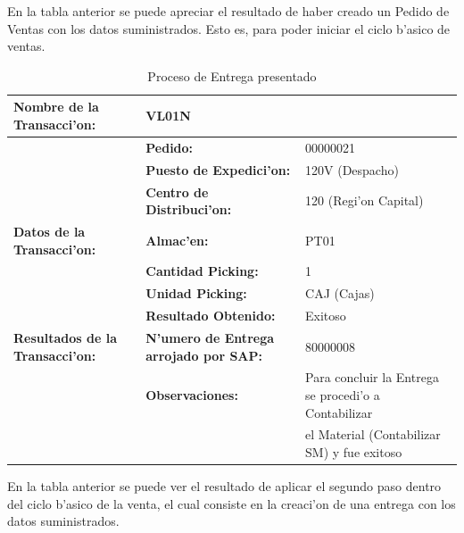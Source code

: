 	En la tabla anterior se puede apreciar el resultado de haber creado un Pedido de Ventas con los datos suministrados. Esto es, para poder iniciar el ciclo b'asico de ventas.
\begin{table}[H]
\footnotesize
\scalebox{0.8} {
\begin{tabular}{l l l}
\toprule
\textbf{Nombre de la Transacci'on:} & VL01N &\\
\midrule
                 & \textbf{Pedido:} & 00000021 \\
                 \cmidrule{2-3}
                 & \textbf{Puesto de Expedici'on:} & 120V (Despacho) \\
                 \cmidrule{2-3}
                 & \textbf{Centro de Distribuci'on:} & 120 (Regi'on Capital) \\
                 \cmidrule{2-3}
\textbf{Datos de la Transacci'on:}                  & \textbf{Almac'en:}                   &   PT01 \\
                 \cmidrule{2-3}
                 & \textbf{Cantidad Picking:}            & 1 \\
                 \cmidrule{2-3}
                 & \textbf{Unidad Picking:}              & CAJ (Cajas) \\
                 \midrule
                 & \textbf{Resultado Obtenido:} & Exitoso \\
                 \cmidrule{2-3}
\textbf{Resultados de la Transacci'on:}    & \textbf{N'umero de Entrega arrojado por SAP:} & 80000008 \\
                 \cmidrule{2-3}
                 & \textbf{Observaciones:} &  Para concluir la Entrega se procedi'o a Contabilizar \\
                 &                                      & el Material (Contabilizar SM) y fue exitoso\\
                 \bottomrule
\end{tabular}}
\caption{Proceso de Entrega presentado}
\label{tb:entrega}
\end{table}
	En la tabla anterior se puede ver el resultado de aplicar el segundo paso dentro del ciclo b'asico de la venta, el cual consiste en la creaci'on de una entrega con los datos suministrados. 
